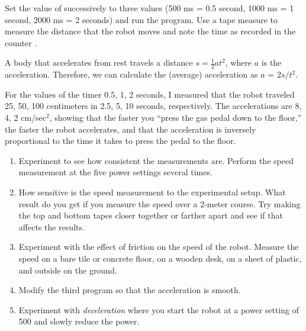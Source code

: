  Set the value of 
successively to three values (500 ms = 0.5 second, 1000 ms = 1 second,
2000 ms = 2 seconds) and run the program. Use a tape measure to measure
the distance that the robot moves and note the time as recorded in the
counter .

A body that accelerates from rest travels a distance $s =
\frac{1}{2}at^2$, where $a$ is the acceleration. Therefore, we can
calculate the (average) acceleration as $a$ = $2s/t^2$.

For the values of the timer 0.5, 1, 2 seconds, I measured that the robot
traveled 25, 50, 100 centimeters in 2.5, 5, 10 seconds, respectively.
The accelerations are 8, 4, 2 cm/sec$^2$, showing that the faster you
``press the gas pedal down to the floor,'' the faster the robot
accelerates, and that the acceleration is inversely proportional to the
time it takes to press the pedal to the floor.


\begin{enumerate}

\item Experiment to see how consistent the measurements are.
Perform the speed measurement at the five power settings several times.

\item How sensitive is the speed measurement to the experimental setup.
What result do you get if you measure the speed over a 2-meter course.
Try making the top and bottom tapes closer together or farther apart and
see if that affects the results.

\item Experiment with the effect of friction on the speed of the robot.
Measure the speed on a bare tile or concrete floor, on a wooden desk, on
a sheet of plastic, and outside on the ground.

\item Modify the third program so that the acceleration is smooth.

\item Experiment with \emph{deceleration} where you start the robot at a
power setting of 500 and slowly reduce the power.

\end{enumerate}
